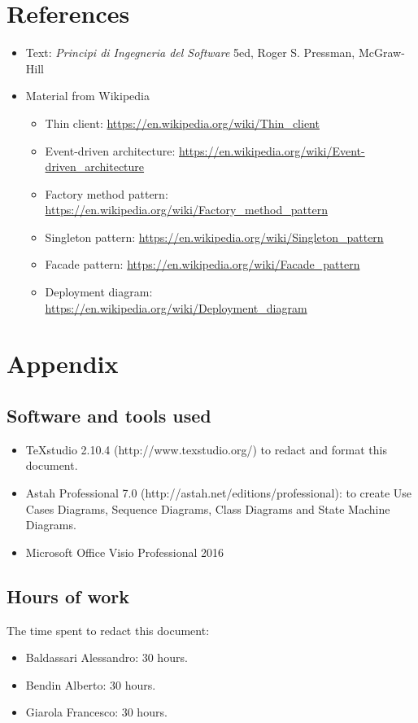 \documentclass[a4paper,11pt]{report} %
\begin{document}
	\pagebreak
	\section{References}
	\begin{itemize}
		\item Text: \textit{Principi di Ingegneria del Software} 5ed, Roger S. Pressman, McGraw-Hill
		\item Material from Wikipedia
		\begin{itemize}
			\item Thin client: \href{https://en.wikipedia.org/wiki/Thin_client}{https://en.wikipedia.org/wiki/Thin\_client}
			\item Event-driven architecture: \href{https://en.wikipedia.org/wiki/Event-driven_architecture}{https://en.wikipedia.org/wiki/Event-driven\_architecture}
			\item Factory method pattern: \href{https://en.wikipedia.org/wiki/Factory_method_pattern}{https://en.wikipedia.org/wiki/Factory\_method\_pattern}
			\item Singleton pattern: \href{https://en.wikipedia.org/wiki/Singleton_pattern}{https://en.wikipedia.org/wiki/Singleton\_pattern}
			\item Facade pattern: \href{https://en.wikipedia.org/wiki/Facade_pattern}{https://en.wikipedia.org/wiki/Facade\_pattern}
			\item Deployment diagram:
			\href{https://en.wikipedia.org/wiki/Deployment_diagram}{https://en.wikipedia.org/wiki/Deployment\_diagram}
		\end{itemize}
	\end{itemize}
	
	
	\section{Appendix}
	
	\subsection{Software and tools used}
	\begin{itemize}
		\item TeXstudio 2.10.4 (http://www.texstudio.org/) to redact and format this document.
		\item Astah Professional 7.0 (http://astah.net/editions/professional): to create Use
		Cases Diagrams, Sequence Diagrams, Class Diagrams and State Machine	Diagrams.
		\item Microsoft Office Visio Professional 2016
	\end{itemize}
	
	\subsection{Hours of work} The time spent to redact this document:
	\begin{itemize}
		\item Baldassari Alessandro: 30 hours.
		\item Bendin Alberto: 30 hours.
		\item Giarola Francesco: 30 hours.
	\end{itemize}
\end{document}

